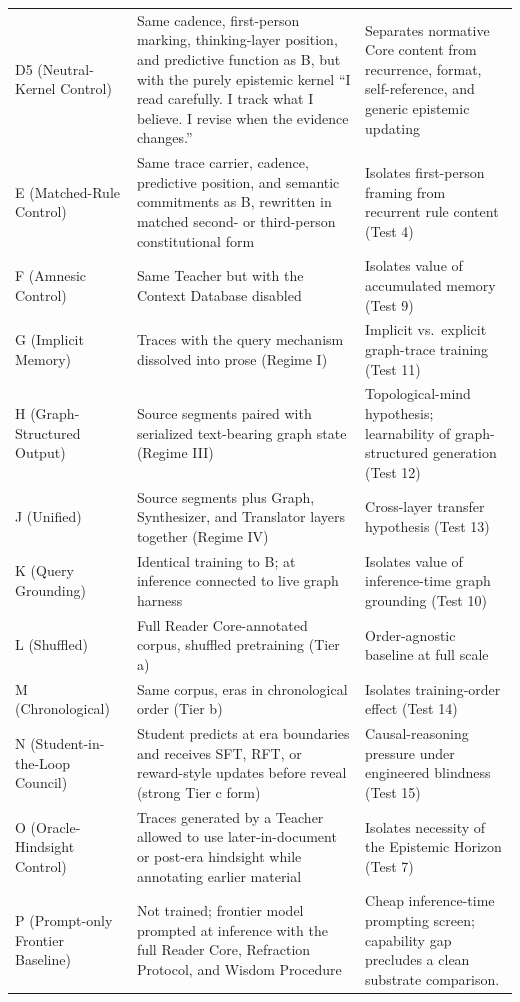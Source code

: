 \begin{longtable}{
  >{\raggedright\arraybackslash}p{3.1cm}
  >{\raggedright\arraybackslash}p{5.5cm}
  >{\raggedright\arraybackslash}p{6.4cm}}
        D5 (Neutral-Kernel Control) & Same cadence, first-person marking, thinking-layer position, and predictive function as B, but with the purely epistemic kernel ``I read carefully. I track what I believe. I revise when the evidence changes.'' & Separates normative Core content from recurrence, format, self-reference, and generic epistemic updating \\
        E (Matched-Rule Control) & Same trace carrier, cadence, predictive position, and semantic commitments as B, rewritten in matched second- or third-person constitutional form & Isolates first-person framing from recurrent rule content (Test 4) \\
        F (Amnesic Control) & Same Teacher but with the Context Database disabled & Isolates value of accumulated memory (Test 9) \\
        G (Implicit Memory) & Traces with the query mechanism dissolved into prose (Regime I) & Implicit vs.\ explicit graph-trace training (Test 11) \\
        H (Graph-Structured Output) & Source segments paired with serialized text-bearing graph state (Regime III) & Topological-mind hypothesis; learnability of graph-structured generation (Test 12) \\
        J (Unified) & Source segments plus Graph, Synthesizer, and Translator layers together (Regime IV) & Cross-layer transfer hypothesis (Test 13) \\
        K (Query Grounding) & Identical training to B; at inference connected to live graph harness & Isolates value of inference-time graph grounding (Test 10) \\
        L (Shuffled) & Full Reader Core-annotated corpus, shuffled pretraining (Tier a) & Order-agnostic baseline at full scale \\
        M (Chronological) & Same corpus, eras in chronological order (Tier b) & Isolates training-order effect (Test 14) \\
        N (Student-in-the-Loop Council) & Student predicts at era boundaries and receives SFT, RFT, or reward-style updates before reveal (strong Tier c form) & Causal-reasoning pressure under engineered blindness (Test 15) \\
        O (Oracle-Hindsight Control) & Traces generated by a Teacher allowed to use later-in-document or post-era hindsight while annotating earlier material & Isolates necessity of the Epistemic Horizon (Test 7) \\
        P (Prompt-only Frontier Baseline) & Not trained; frontier model prompted at inference with the full Reader Core, Refraction Protocol, and Wisdom Procedure & Cheap inference-time prompting screen; capability gap precludes a clean substrate comparison. \\

\end{longtable}
